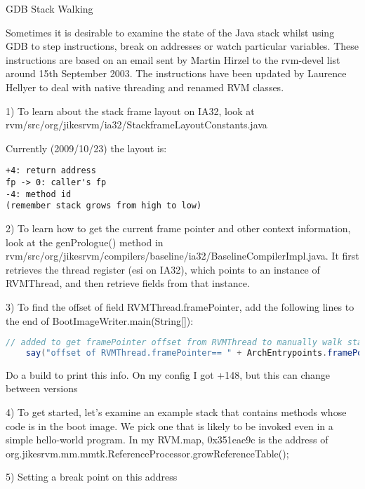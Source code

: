 \begin{section}{GDB Stack Walking}
\label{sec:gdbstackwalking}



Sometimes it is desirable to examine the state of the Java stack whilst using GDB to step instructions, break on addresses or watch particular variables. These instructions are based on an email sent by Martin Hirzel to the rvm-devel list around 15th September 2003. The instructions have been updated by Laurence Hellyer to deal with native threading and renamed RVM classes.

1) To learn about the stack frame layout on IA32, look at rvm/src/org/jikes\-rvm/ia32/Stack\-frame\-Layout\-Constants.java

Currently (2009/10/23) the layout is: 
\begin{lstlisting}[breaklines=true,breakatwhitespace=false]
+4: return address
fp -> 0: caller's fp
-4: method id
(remember stack grows from high to low)
\end{lstlisting}

2) To learn how to get the current frame pointer and other context information, look at the genPrologue() method in rvm/src/org/jikesrvm/compilers/baseline/ia32/BaselineCompilerImpl.java. It first retrieves the thread register (esi on IA32), which points to an instance of RVMThread, and then retrieve fields from that instance.

3) To find the offset of field RVMThread.framePointer, add the following lines to the end of BootImageWriter.main(String[]):

\begin{lstlisting}[breaklines=true,breakatwhitespace=false,language=Java]
    // added to get framePointer offset from RVMThread to manually walk stacks in GDB
    say("offset of RVMThread.framePointer== " + ArchEntrypoints.framePointerField.getOffset());
\end{lstlisting}

Do a build to print this info. On my config I got +148, but this can change between versions

4) To get started, let's examine an example stack that contains methods whose code is in the boot image. We pick one that is likely to be invoked even in a simple hello-world program. In my RVM.map, 0x351eae9c is the address of org.jikesrvm.mm.mmtk.ReferenceProcessor.growReferenceTable();

5) Setting a break point on this address


\end{section}
